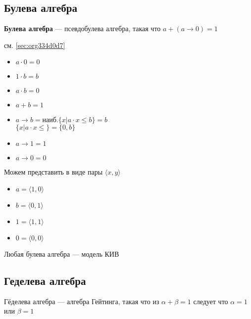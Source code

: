 \documentclass[english]{article}
\begin{document}
\subsection{Булева алгебра}
\label{sec:orgcbe9b2d}
\begin{definition}
	\textbf{Булева алгебра} --- псевдобулева алгебра, такая что \(a + (a \to 0) = 1\)
	\label{org85be37c}
\end{definition}
\begin{examp}
	см. \ref{sec:org334d0d7}
\end{examp}
\begin{examp}
	\-
	\begin{center}
	\end{center}
	\begin{itemize}
		\item \(a \cdot 0 = 0\)
		\item \(1\cdot b = b\)
		\item \(a \cdot b = 0\)
		\item \(a + b = 1\)
		\item \(a \to b = \text{наиб.}\{x \big| a\cdot x \le b\} = b\) \\
		      \(\{x \big| a \cdot x \le \} = \{0, b\}\)
		\item \(a \to 1 = 1\)
		\item \(a \to 0 = 0\)
	\end{itemize}
	Можем представить в виде пары \(\langle x, y \rangle\)
	\begin{itemize}
		\item \(a = \langle 1, 0 \rangle\)
		\item \(b = \langle 0 , 1\rangle\)
		\item \(1 = \langle 1, 1 \rangle\)
		\item \(0 = \langle 0, 0 \rangle\)
	\end{itemize}
	\label{orgad69fc5}
\end{examp}
\begin{theorem}
	Любая булева алгебра --- модель КИВ
	\label{org0586fb8}
\end{theorem}
\subsection{Геделева алгебра}
\label{sec:org3bbc5e6}
\begin{definition}
	Гёделева алгебра --- алгебра Гейтинга, такая что из \(\alpha + \beta = 1\) следует что \(\alpha = 1\) или \(\beta = 1\) \\
	\label{orgbcbdbfb}
\end{definition}
\end{document}
